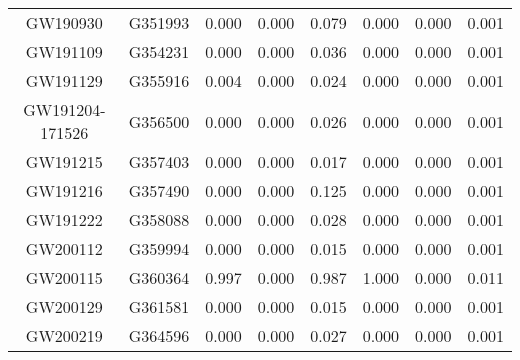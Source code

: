 \begin{table}[]
\begin{tabular}{c|c|ccr|ccr}
GW190930                      & G351993               & 0.000                   & 0.000                    & 0.079                   & 0.000                   & 0.000                    & 0.001                   \\
GW191109                      & G354231               & 0.000                   & 0.000                    & 0.036                   & 0.000                   & 0.000                    & 0.001                   \\
GW191129                      & G355916               & 0.004                   & 0.000                    & 0.024                   & 0.000                   & 0.000                    & 0.001                   \\
GW191204-171526               & G356500               & 0.000                   & 0.000                    & 0.026                   & 0.000                   & 0.000                    & 0.001                   \\
GW191215                      & G357403               & 0.000                   & 0.000                    & 0.017                   & 0.000                   & 0.000                    & 0.001                   \\
GW191216                      & G357490               & 0.000                   & 0.000                    & 0.125                   & 0.000                   & 0.000                    & 0.001                   \\
GW191222                      & G358088               & 0.000                   & 0.000                    & 0.028                   & 0.000                   & 0.000                    & 0.001                   \\
GW200112                      & G359994               & 0.000                   & 0.000                    & 0.015                   & 0.000                   & 0.000                    & 0.001                   \\
GW200115                      & G360364               & 0.997                   & 0.000                    & 0.987                   & 1.000                   & 0.000                    & 0.011                   \\
GW200129                      & G361581               & 0.000                   & 0.000                    & 0.015                   & 0.000                   & 0.000                    & 0.001                   \\
GW200219                      & G364596               & 0.000                   & 0.000                    & 0.027                   & 0.000                   & 0.000                    & 0.001                   \\

\end{tabular}
\end{table}
